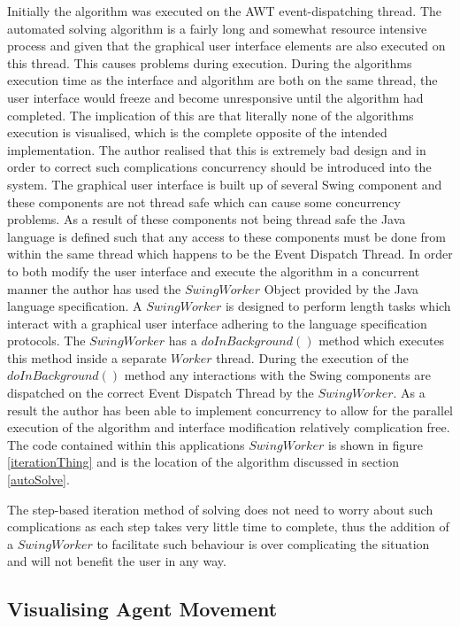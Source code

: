 Initially the algorithm was executed on the AWT event-dispatching thread. The automated solving algorithm is a fairly long and somewhat resource intensive process and given that the graphical user interface elements are also executed on this thread. This causes problems during execution. During the algorithms execution time as the interface and algorithm are both on the same thread, the user interface would freeze and become unresponsive until the algorithm had completed. The implication of this are that literally none of the algorithms execution is visualised, which is the complete opposite of the intended implementation. The author realised that this is extremely bad design and in order to correct such complications concurrency should be introduced into the system. The graphical user interface is built up of several Swing component and these components are not thread safe which can cause some concurrency problems. As a result of these components not being thread safe the Java language is defined such that any access to these components must be done from within the same thread which happens to be the Event Dispatch Thread. In order to both modify the user interface and execute the algorithm in a concurrent manner the author has used the $SwingWorker$ Object provided by the Java language specification. A $SwingWorker$ is designed to perform length tasks which interact with a graphical user interface adhering to the language specification protocols. The $SwingWorker$ has a $doInBackground()$ method which executes this method inside a separate $Worker$ thread. During the execution of the $doInBackground()$ method any interactions with the Swing components are dispatched on the correct Event Dispatch Thread by the $SwingWorker$. As a result the author has been able to implement concurrency to allow for the parallel execution of the algorithm and interface modification relatively complication free. The code contained within this applications $SwingWorker$ is shown in figure \ref{iterationThing} and is the location of the algorithm discussed in section \ref{autoSolve}. 

The step-based iteration method of solving does not need to worry about such complications as each step takes very little time to complete, thus the addition of a $SwingWorker$ to facilitate such behaviour is over complicating the situation and will not benefit the user in any way.

\subsection{Visualising Agent Movement}

